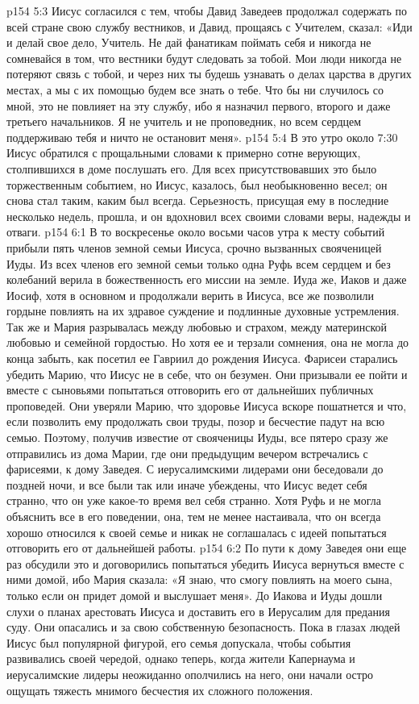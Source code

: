 \vs p154 5:3 Иисус согласился с тем, чтобы Давид Заведеев продолжал содержать по всей стране свою службу вестников, и Давид, прощаясь с Учителем, сказал: «Иди и делай свое дело, Учитель. Не дай фанатикам поймать себя и никогда не сомневайся в том, что вестники будут следовать за тобой. Мои люди никогда не потеряют связь с тобой, и через них ты будешь узнавать о делах царства в других местах, а мы с их помощью будем все знать о тебе. Что бы ни случилось со мной, это не повлияет на эту службу, ибо я назначил первого, второго и даже третьего начальников. Я не учитель и не проповедник, но всем сердцем поддерживаю тебя и ничто не остановит меня».
\vs p154 5:4 В это утро около 7:30 Иисус обратился с прощальными словами к примерно сотне верующих, столпившихся в доме послушать его. Для всех присутствовавших это было торжественным событием, но Иисус, казалось, был необыкновенно весел; он снова стал таким, каким был всегда. Серьезность, присущая ему в последние несколько недель, прошла, и он вдохновил всех своими словами веры, надежды и отваги.
\vs p154 6:1 В то воскресенье около восьми часов утра к месту событий прибыли пять членов земной семьи Иисуса, срочно вызванных свояченицей Иуды. Из всех членов его земной семьи только одна Руфь всем сердцем и без колебаний верила в божественность его миссии на земле. Иуда же, Иаков и даже Иосиф, хотя в основном и продолжали верить в Иисуса, все же позволили гордыне повлиять на их здравое суждение и подлинные духовные устремления. Так же и Мария разрывалась между любовью и страхом, между материнской любовью и семейной гордостью. Но хотя ее и терзали сомнения, она не могла до конца забыть, как посетил ее Гавриил до рождения Иисуса. Фарисеи старались убедить Марию, что Иисус не в себе, что он безумен. Они призывали ее пойти и вместе с сыновьями попытаться отговорить его от дальнейших публичных проповедей. Они уверяли Марию, что здоровье Иисуса вскоре пошатнется и что, если позволить ему продолжать свои труды, позор и бесчестие падут на всю семью. Поэтому, получив известие от свояченицы Иуды, все пятеро сразу же отправились из дома Марии, где они предыдущим вечером встречались с фарисеями, к дому Заведея. С иерусалимскими лидерами они беседовали до поздней ночи, и все были так или иначе убеждены, что Иисус ведет себя странно, что он уже какое\hyp{}то время вел себя странно. Хотя Руфь и не могла объяснить все в его поведении, она, тем не менее настаивала, что он всегда хорошо относился к своей семье и никак не соглашалась с идеей попытаться отговорить его от дальнейшей работы.
\vs p154 6:2 По пути к дому Заведея они еще раз обсудили это и договорились попытаться убедить Иисуса вернуться вместе с ними домой, ибо Мария сказала: «Я знаю, что смогу повлиять на моего сына, только если он придет домой и выслушает меня». До Иакова и Иуды дошли слухи о планах арестовать Иисуса и доставить его в Иерусалим для предания суду. Они опасались и за свою собственную безопасность. Пока в глазах людей Иисус был популярной фигурой, его семья допускала, чтобы события развивались своей чередой, однако теперь, когда жители Капернаума и иерусалимские лидеры неожиданно ополчились на него, они начали остро ощущать тяжесть мнимого бесчестия их сложного положения.
